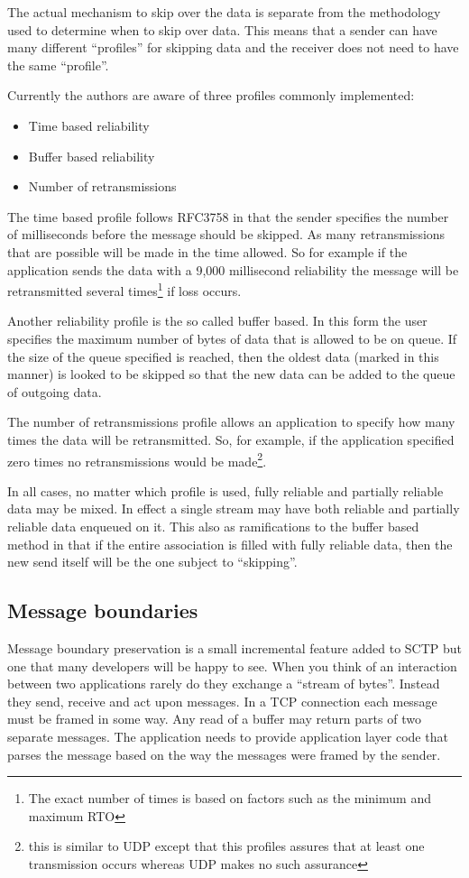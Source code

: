 \documentclass[conference]{IEEEtran}
\begin{document}
The actual mechanism to skip over the data is separate from the
methodology used to determine when to skip over data. This means that
a sender can have many different ``profiles'' for skipping data and the
receiver does not need to have the same ``profile''.

Currently the authors are aware of three profiles commonly implemented:
\begin{itemize}
  \item Time based reliability
  \item Buffer based reliability
  \item Number of retransmissions
\end{itemize}
The time based profile follows RFC3758 in that the sender specifies
the number of milliseconds before the message should be skipped.  As
many retransmissions that are possible will be made in the time allowed.
So for example if the application sends the data with a 9,000 millisecond
reliability the message will be retransmitted several times\footnote{The exact
number of times is based on factors such as the minimum and maximum RTO} if loss occurs.

Another reliability profile is the so called buffer based. In this form the user specifies the maximum
number of bytes of data that is allowed to be on queue. If the size of the queue 
specified is reached, then the oldest data (marked in this manner) is looked to be
skipped so that the new data can be added to the queue of outgoing data.

The number of retransmissions profile allows an application to specify how many
times the data will be retransmitted. So, for example, if the application specified
zero times no retransmissions would be made\footnote{this is similar to UDP
except that this profiles assures that at least one transmission occurs whereas
UDP makes no such assurance}.

In all cases, no matter which profile is used, fully reliable and partially reliable
data may be mixed. In effect a single stream may have both reliable and
partially reliable data enqueued on it. This also as ramifications to the 
buffer based method in that if the entire association is filled with 
fully reliable data, then the new send itself will be the one subject
to ``skipping''.

\subsection{Message boundaries}
\label{mbound}
Message boundary preservation is a small incremental feature added to
SCTP but one that many developers will be happy to see. When you think of
an interaction between two applications rarely do they exchange a ``stream of bytes''.
Instead they send, receive and act upon messages. In a TCP connection each
message must be framed in some way. Any read of a buffer may return
parts of two separate messages. The application needs to provide application
layer code that parses the message based on the way the messages
were framed by the sender. 
\end{document}
